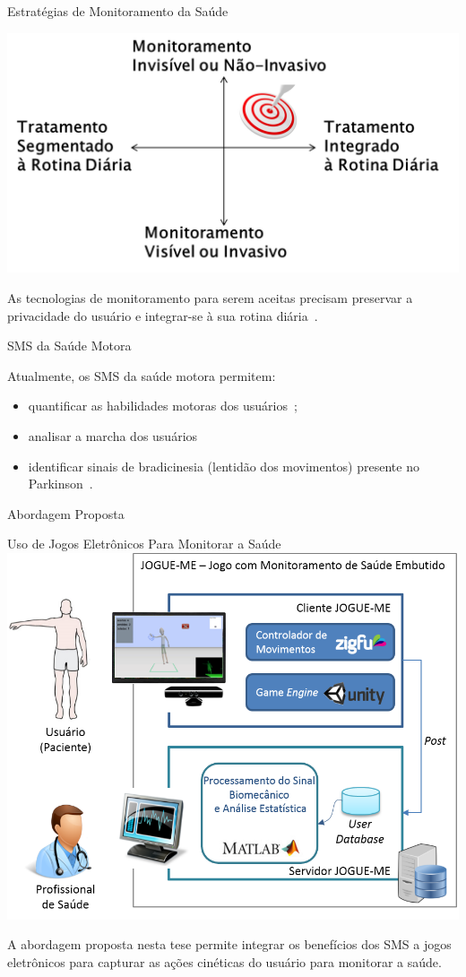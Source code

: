 \documentclass{beamer}
\begin{document}
\begin{frame}{Estratégias de Monitoramento da Saúde}
  \begin{block}{}
      \center \includegraphics[height=1.8 in]{img/estrategmonitorament.png}
  \end{block}
  \begin{block}{}
As tecnologias de monitoramento para serem aceitas precisam preservar a privacidade do usuário e integrar-se à sua rotina diária~\cite{alemdar2015}.
  \end{block}
\end{frame}


\begin{frame}{SMS da Saúde Motora}  
  \begin{block}{}  
  Atualmente, os SMS da saúde motora permitem:  
    \begin{itemize}[<+->]
    \item quantificar as habilidades motoras dos usuários~\cite{manumeterjbhi2014,patel_monitoring_2009};
    \item analisar a marcha dos usuários~\cite{robotgait2014}
    \item identificar sinais de bradicinesia (lentidão dos movimentos) presente no Parkinson~\cite{ambulatoryparkinson2010}. 
    \end{itemize}   
  \end{block}   
\end{frame}

\begin{frame}{Abordagem Proposta}
  \begin{block}{Uso de Jogos Eletrônicos Para Monitorar a Saúde}
      \center \includegraphics[height=1.8 in]{img/visaosistema.png}
  \end{block}
  \begin{block}{ }
A abordagem proposta nesta tese permite integrar os benefícios dos SMS a jogos eletrônicos para capturar as ações cinéticas do usuário para monitorar a saúde. 
  \end{block}
\end{frame}
\end{document}
